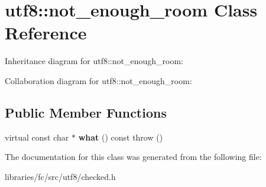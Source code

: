 \hypertarget{classutf8_1_1not__enough__room}{}\section{utf8\+:\+:not\+\_\+enough\+\_\+room Class Reference}
\label{classutf8_1_1not__enough__room}


Inheritance diagram for utf8\+:\+:not\+\_\+enough\+\_\+room\+:


Collaboration diagram for utf8\+:\+:not\+\_\+enough\+\_\+room\+:
\subsection*{Public Member Functions}
\begin{DoxyCompactItemize}
\item 
\mbox{\label{classutf8_1_1not__enough__room_a23cf8d0fad547f9ad2fbfa272cb1add0}} 
virtual const char $\ast$ {\bfseries what} () const  throw ()
\end{DoxyCompactItemize}


The documentation for this class was generated from the following file\+:\begin{DoxyCompactItemize}
\item 
libraries/fc/src/utf8/checked.\+h\end{DoxyCompactItemize}
